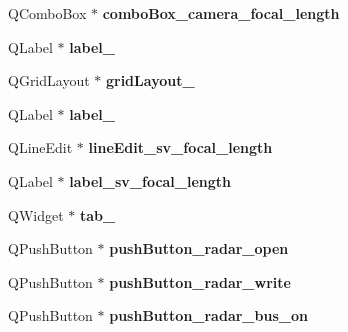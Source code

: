 \begin{DoxyCompactItemize}
\item 
\hypertarget{class_ui___main_window_a3b3e389cb1c556a500f92e1ba63cd021}{}Q\+Combo\+Box $\ast$ {\bfseries combo\+Box\+\_\+camera\+\_\+focal\+\_\+length}\label{class_ui___main_window_a3b3e389cb1c556a500f92e1ba63cd021}

\item 
\hypertarget{class_ui___main_window_a0e90c7e9ad77386881e0b264ddb9dd22}{}Q\+Label $\ast$ {\bfseries label\+\_}\label{class_ui___main_window_a0e90c7e9ad77386881e0b264ddb9dd22}

\item 
\hypertarget{class_ui___main_window_a79b264e6945e3b94a511427b1c270dd7}{}Q\+Grid\+Layout $\ast$ {\bfseries grid\+Layout\+\_}\label{class_ui___main_window_a79b264e6945e3b94a511427b1c270dd7}

\item 
\hypertarget{class_ui___main_window_ab6ac4329a89041f557332f6569d94493}{}Q\+Label $\ast$ {\bfseries label\+\_}\label{class_ui___main_window_ab6ac4329a89041f557332f6569d94493}

\item 
\hypertarget{class_ui___main_window_ae921883b67fcf5e8863e06d44209cebb}{}Q\+Line\+Edit $\ast$ {\bfseries line\+Edit\+\_\+sv\+\_\+focal\+\_\+length}\label{class_ui___main_window_ae921883b67fcf5e8863e06d44209cebb}

\item 
\hypertarget{class_ui___main_window_ac9c95f02d5a1526633c68b6b42af0e3c}{}Q\+Label $\ast$ {\bfseries label\+\_\+sv\+\_\+focal\+\_\+length}\label{class_ui___main_window_ac9c95f02d5a1526633c68b6b42af0e3c}

\item 
\hypertarget{class_ui___main_window_a7d8a29446578759800fab35c698b6be2}{}Q\+Widget $\ast$ {\bfseries tab\+\_}\label{class_ui___main_window_a7d8a29446578759800fab35c698b6be2}

\item 
\hypertarget{class_ui___main_window_a67ec284dc24ae45cf5724cfd3714e34b}{}Q\+Push\+Button $\ast$ {\bfseries push\+Button\+\_\+radar\+\_\+open}\label{class_ui___main_window_a67ec284dc24ae45cf5724cfd3714e34b}

\item 
\hypertarget{class_ui___main_window_a9487af156e57a64fea171cf47a8e9b6f}{}Q\+Push\+Button $\ast$ {\bfseries push\+Button\+\_\+radar\+\_\+write}\label{class_ui___main_window_a9487af156e57a64fea171cf47a8e9b6f}

\item 
\hypertarget{class_ui___main_window_ac34893c399af195cf5567ab86921f749}{}Q\+Push\+Button $\ast$ {\bfseries push\+Button\+\_\+radar\+\_\+bus\+\_\+on}\label{class_ui___main_window_ac34893c399af195cf5567ab86921f749}


\end{DoxyCompactItemize}
